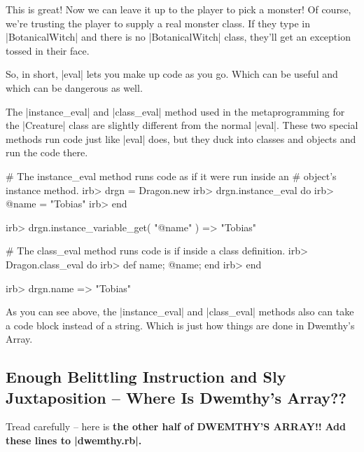 \documentclass[12pt,twoside]{report}
\begin{document}
This is great!  Now we can leave it up to the player to pick a
monster!  Of course, we're trusting the player to supply a real
monster class.  If they type in
\rubyinline|BotanicalWitch| and there is no
\rubyinline|BotanicalWitch| class, they'll get an
exception tossed in their face.

So, in short, \rubyinline|eval| lets you make up code
as you go.  Which can be useful and which can be dangerous as well.

The \rubyinline|instance_eval| and
\rubyinline|class_eval| method used in the
metaprogramming for the \rubyinline|Creature| class
are slightly different from the normal
\rubyinline|eval|.  These two special methods run code
just like \rubyinline|eval| does, but they duck into
classes and objects and run the code there.


\begin{consolecode}

 # The instance_eval method runs code as if it were run inside an
 # object's instance method.
 irb> drgn = Dragon.new
 irb> drgn.instance_eval do
 irb>   @name = "Tobias"
 irb> end

 irb> drgn.instance_variable_get( "@name" )
   => "Tobias"

 # The class_eval method runs code is if inside a class definition.
 irb> Dragon.class_eval do
 irb>   def name; @name; end
 irb> end

 irb> drgn.name
   => "Tobias"

\end{consolecode}


As you can see above, the \rubyinline|instance_eval|
and \rubyinline|class_eval| methods also can take a
code block instead of a string.  Which is just how things are done in
Dwemthy's Array.



\subsection{Enough Belittling Instruction and Sly Juxtaposition -- Where Is Dwemthy's Array??}



Tread carefully -- here is {\bf the other half of DWEMTHY'S ARRAY!!}
{\bf Add these lines to \rubyinline|dwemthy.rb|.}
\end{document}
